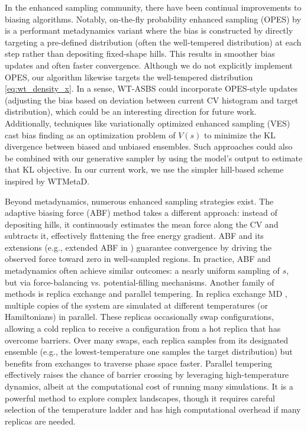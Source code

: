 \documentclass[]{fairmeta}
\theoremstyle{remark}
\begin{document}
In the enhanced sampling community, there have been continual improvements to biasing algorithms. Notably, on-the-fly probability enhanced sampling (OPES) by \citet{invernizzi2020rethinking} is a performant metadynamics variant where the bias is constructed by directly targeting a pre-defined distribution (often the well-tempered distribution) at each step rather than depositing fixed-shape hills. This results in smoother bias updates and often faster convergence. Although we do not explicitly implement OPES, our algorithm likewise targets the well-tempered distribution \cref{eq:wt_density_x}. In a sense, WT-ASBS could incorporate OPES-style updates (adjusting the bias based on deviation between current CV histogram and target distribution), which could be an interesting direction for future work. Additionally, techniques like variationally optimized enhanced sampling (VES) \citep{valsson2014variational} cast bias finding as an optimization problem of $V(s)$ to minimize the KL divergence between biased and unbiased ensembles. Such approaches could also be combined with our generative sampler by using the model's output to estimate that KL objective. In our current work, we use the simpler hill-based scheme inspired by WTMetaD.

Beyond metadynamics, numerous enhanced sampling strategies exist. The adaptive biasing force (ABF) method \citep{darve2008adaptive} takes a different approach: instead of depositing hills, it continuously estimates the mean force along the CV and subtracts it, effectively flattening the free energy gradient. ABF and its extensions (e.g., extended ABF in \citet{comer2015adaptive}) guarantee convergence by driving the observed force toward zero in well-sampled regions. In practice, ABF and metadynamics often achieve similar outcomes: a nearly uniform sampling of $s$, but via force-balancing vs. potential-filling mechanisms.
Another family of methods is replica exchange and parallel tempering. In replica exchange MD \citep{sugita1999replica}, multiple copies of the system are simulated at different temperatures (or Hamiltonians) in parallel. These replicas occasionally swap configurations, allowing a cold replica to receive a configuration from a hot replica that has overcome barriers. Over many swaps, each replica samples from its designated ensemble (e.g., the lowest-temperature one samples the target distribution) but benefits from exchanges to traverse phase space faster. Parallel tempering effectively raises the chance of barrier crossing by leveraging high-temperature dynamics, albeit at the computational cost of running many simulations. It is a powerful method to explore complex landscapes, though it requires careful selection of the temperature ladder and has high computational overhead if many replicas are needed.
\end{document}
